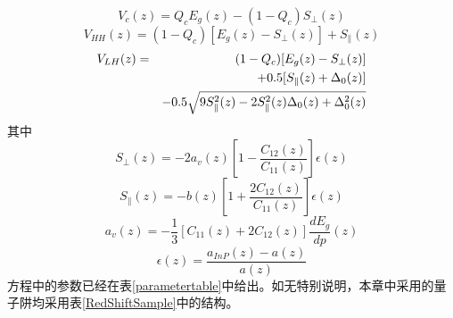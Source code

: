 \documentclass[oneside]{ZJUthesis}
\begin{document}
\begin{equation}
    \label{V_c}
    V_c(z) = Q_c E_g(z) - (1-Q_c)S_\perp(z)
\end{equation}
\begin{equation}
    \label{V_HH}
    V_{HH}(z) = (1-Q_c)[E_g(z) - S_\perp(z)] + S_\parallel(z)
\end{equation}
\begin{eqnarray}
    \label{V_LH}
    V_{LH}(z)&=& (1-Q_c)[E_g(z) - S_\perp(z)] \notag\\
    && +0.5[S_\parallel(z) + \Delta_0(z)] \notag\\
    && -0.5 \sqrt{9S_\parallel^2(z)-2S_\parallel^2(z)\Delta_0(z)+\Delta_0^2(z)}
\end{eqnarray}
其中
\begin{equation}
    \label{S_perp}
    S_\perp(z) = -2a_v(z)[1-\frac{C_{12}(z)}{C_{11}(z)}] \epsilon(z)
\end{equation}
\begin{equation}\label{S_parallel}
    S_\parallel(z) = -b(z)[1+\frac{2C_{12}(z)}{C_{11}(z)}] \epsilon(z)
\end{equation}
\begin{equation}\label{a_v}
    a_v(z) = -\frac{1}{3}[C_{11}(z)+2C_{12}(z)] \frac{dE_g}{dp}(z)
\end{equation}
\begin{equation}\label{epsilon}
    \epsilon(z) = \frac{a_{InP}(z)-a(z)}{a(z)}
\end{equation}
方程中的参数已经在表\ref{parametertable}中给出。如无特别说明，本章中采用的量子阱均采用表\ref{RedShiftSample}中的结构。
\end{document}
